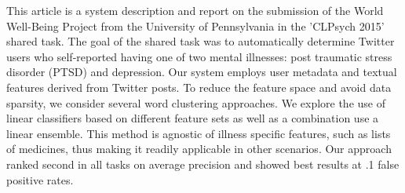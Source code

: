 This article is a system description and report on the submission of the World Well-Being Project from the University of Pennsylvania in the 'CLPsych 2015' shared task. The goal of the shared task was to automatically determine Twitter users who self-reported having one of two mental illnesses: post traumatic stress disorder (PTSD) and depression. Our system employs user metadata and textual features derived from Twitter posts. To reduce the feature space and avoid data sparsity, we consider several word clustering approaches. We explore the use of linear classifiers based on different feature sets as well as a combination use a linear ensemble. This method is agnostic of illness specific features, such as lists of medicines, thus making it readily applicable in other scenarios. Our approach ranked second in all tasks on average precision and showed best results at .1 false positive rates.
